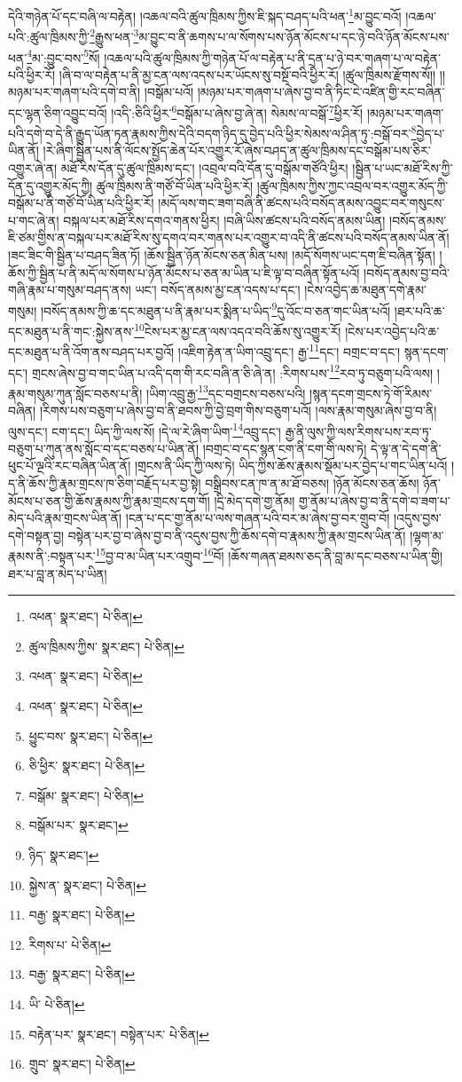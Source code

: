 དེའི་གཉེན་པོ་དང་བཞི་ལ་བརྟེན། །འཆལ་བའི་ཚུལ་ཁྲིམས་ཀྱིས་ཇི་སྐད་བཤད་པའི་ཕན་\footnote{འཕན་  སྣར་ཐང་།  པེ་ཅིན། }མ་བྱུང་བའོ། །འཆལ་པའི་:ཚུལ་ཁྲིམས་ཀྱི་\footnote{ཚུལ་ཁྲིམས་ཀྱིས་  སྣར་ཐང་།  པེ་ཅིན། }རྒྱུས་ཕན་\footnote{འཕན་  སྣར་ཐང་།  པེ་ཅིན། }མ་བྱུང་བ་ནི་ཆགས་པ་ལ་སོགས་པས་ཉོན་མོངས་པ་དང་ཉེ་བའི་ཉོན་མོངས་པས་ཕན་\footnote{འཕན་  སྣར་ཐང་།  པེ་ཅིན། }མ་:བྱུང་བས་\footnote{ཕྱུང་བས་  སྣར་ཐང་།  པེ་ཅིན། }སོ། །འཆལ་པའི་ཚུལ་ཁྲིམས་ཀྱི་གཉེན་པོ་ལ་བརྟེན་པ་ནི་དྲན་པ་ཉེ་བར་གཞག་པ་ལ་བརྟེན་པའི་ཕྱིར་རོ། །ཞི་བ་ལ་བརྟེན་པ་ནི་མྱ་ངན་ལས་འདས་པར་ཡོངས་སུ་བསྔོ་བའི་ཕྱིར་རོ། །ཚུལ་ཁྲིམས་རྫོགས་སོ།། །།མཉམ་པར་གཞག་པའི་དགེ་བ་ནི། །བསྒོམ་པའོ། །མཉམ་པར་གཞག་པ་ཞེས་བྱ་བ་ནི་ཏིང་ངེ་འཛིན་གྱི་རང་བཞིན་དང་ལྷན་ཅིག་འབྱུང་བའོ། །འདི་:ཅིའི་ཕྱིར་\footnote{ཅི་ཕྱིར་  སྣར་ཐང་།  པེ་ཅིན། }བསྒོམ་པ་ཞེས་བྱ་ཞེ་ན། སེམས་ལ་བསྒོ་\footnote{བསྒོམ་  སྣར་ཐང་།  པེ་ཅིན། }ཕྱིར་རོ། །མཉམ་པར་གཞག་པའི་དགེ་བ་དེ་ནི་རྒྱུད་ཡོན་ཏན་རྣམས་ཀྱིས་དེའི་བདག་ཉིད་དུ་བྱེད་པའི་ཕྱིར་སེམས་ལ་ཤིན་ཏུ་:བསྒོ་བར་\footnote{བསྒོམ་པར་  སྣར་ཐང་། }བྱེད་པ་ཡིན་ནོ། །རེ་ཞིག་སྦྱིན་པས་ནི་ལོངས་སྤྱོད་ཆེན་པོར་འགྱུར་རོ་ཞེས་བཤད་ན་ཚུལ་ཁྲིམས་དང་བསྒོམ་པས་ཅིར་འགྱུར་ཞེ་ན། མཐོ་རིས་དོན་དུ་ཚུལ་ཁྲིམས་དང་། །འབྲལ་བའི་དོན་དུ་བསྒོམ་གཙོའི་ཕྱིར། །སྦྱིན་པ་ཡང་མཐོ་རིས་ཀྱི་དོན་དུ་འགྱུར་མོད་ཀྱི། ཚུལ་ཁྲིམས་ནི་གཙོ་བོ་ཡིན་པའི་ཕྱིར་རོ། །ཚུལ་ཁྲིམས་ཀྱིས་ཀྱང་འབྲལ་བར་འགྱུར་མོད་ཀྱི་བསྒོམ་པ་ནི་གཙོ་བོ་ཡིན་པའི་ཕྱིར་རོ། །མདོ་ལས་གང་ཟག་བཞི་ནི་ཚངས་པའི་བསོད་ནམས་འབྱུང་བར་གསུངས་པ་གང་ཞེ་ན། བསྐལ་པར་མཐོ་རིས་དགའ་གནས་ཕྱིར། །བཞི་ཡིས་ཚངས་པའི་བསོད་ནམས་ཡིན། །བསོད་ནམས་ཇི་ཙམ་གྱིས་ན་བསྐལ་པར་མཐོ་རིས་སུ་དགའ་བར་གནས་པར་འགྱུར་བ་འདི་ནི་ཚངས་པའི་བསོད་ནམས་ཡིན་ནོ། །ཟང་ཟིང་གི་སྦྱིན་པ་བཤད་ཟིན་ཏོ། །ཆོས་སྦྱིན་ཉོན་མོངས་ཅན་མིན་པས། །མདོ་སོགས་ཡང་དག་ཇི་བཞིན་སྟོན། །ཆོས་ཀྱི་སྦྱིན་པ་ནི་མདོ་ལ་སོགས་པ་ཉོན་མོངས་པ་ཅན་མ་ཡིན་པ་ཇི་ལྟ་བ་བཞིན་སྟོན་པའོ། །བསོད་ནམས་བྱ་བའི་གཞི་རྣམ་པ་གསུམ་བཤད་ནས། ཡང་། བསོད་ནམས་མྱ་ངན་འདས་པ་དང་། །ངེས་འབྱེད་ཆ་མཐུན་དགེ་རྣམ་གསུམ། །བསོད་ནམས་ཀྱི་ཆ་དང་མཐུན་པ་ནི་རྣམ་པར་སྨིན་པ་ཡིད་\footnote{ཉིད་  སྣར་ཐང་། }དུ་འོང་བ་ཅན་གང་ཡིན་པའོ། །ཐར་པའི་ཆ་དང་མཐུན་པ་ནི་གང་:སྐྱེས་ནས་\footnote{སྐྱེས་ན་  སྣར་ཐང་།  པེ་ཅིན། }ངེས་པར་མྱ་ངན་ལས་འདའ་བའི་ཆོས་སུ་འགྱུར་རོ། །ངེས་པར་འབྱེད་པའི་ཆ་དང་མཐུན་པ་ནི་འོག་ནས་བཤད་པར་བྱའོ། །འཇིག་རྟེན་ན་ཡིག་འབྲུ་དང་། རྒྱ་\footnote{བརྒྱ་  སྣར་ཐང་།  པེ་ཅིན། }དང་། བགྲང་བ་དང་། སྙན་དངག་དང་། གྲངས་ཞེས་བྱ་བ་གང་ཡིན་པ་འདི་དག་གི་རང་བཞི་ན་ཅི་ཞེ་ན། :རིགས་པས་\footnote{རིགས་པ་  པེ་ཅིན། }རབ་ཏུ་བཅུག་པའི་ལས། །རྣམ་གསུམ་ཀུན་སློང་བཅས་པ་ནི། །ཡིག་འབྲུ་རྒྱ་\footnote{བརྒྱ་  སྣར་ཐང་།  པེ་ཅིན། }དང་བགྲངས་བཅས་པའི། །སྙན་དངག་གྲངས་ཏེ་གོ་རིམས་བཞིན། །རིགས་པས་བཅུག་པ་ཞེས་བྱ་བ་ནི་ཐབས་ཀྱི་བྱེ་བྲག་གིས་བཅུག་པའོ། །ལས་རྣམ་གསུམ་ཞེས་བྱ་བ་ནི། ལུས་དང་། ངག་དང་། ཡིད་ཀྱི་ལས་སོ། །དེ་ལ་རེ་ཞིག་ཡིག་\footnote{ཡི་  པེ་ཅིན། }འབྲུ་དང་། རྒྱ་ནི་ལུས་ཀྱི་ལས་རིགས་པས་རབ་ཏུ་བཅུག་པ་ཀུན་ནས་སློང་བ་དང་བཅས་པ་ཡིན་ནོ། །བགྲང་བ་དང་སྙན་ངག་ནི་ངག་གི་ལས་ཏེ། དེ་ལྟ་ན་དེ་དག་ནི་ཕུང་པོ་ལྔའི་རང་བཞིན་ཡིན་ནོ། །གྲངས་ནི་ཡིད་ཀྱི་ལས་ཏེ། ཡིད་ཀྱིས་ཆོས་རྣམས་སྡོམ་པར་བྱེད་པ་གང་ཡིན་པའོ། །ད་ནི་ཆོས་ཀྱི་རྣམ་གྲངས་ཁ་ཅིག་བརྗོད་པར་བྱ་སྟེ། བསྒྲིབས་ངན་ཁ་ན་མ་ཐོ་བཅས། །ཉོན་མོངས་ཅན་ཆོས། ཉོན་མོངས་པ་ཅན་གྱི་ཆོས་རྣམས་ཀྱི་རྣམ་གྲངས་དག་གོ། །དྲི་མེད་དགེ་གྱ་ནོམ། གྱ་ནོམ་པ་ཞེས་བྱ་བ་ནི་དགེ་བ་ཟག་པ་མེད་པའི་རྣམ་གྲངས་ཡིན་ནོ། །ངན་པ་དང་གྱ་ནོམ་པ་ལས་གཞན་པའི་བར་མ་ཞེས་བྱ་བར་གྲུབ་བོ། །འདུས་བྱས་དགེ་བསྟན་བྱ། བསྟེན་པར་བྱ་བ་ཞེས་བྱ་བ་ནི་འདུས་བྱས་ཀྱི་ཆོས་དགེ་བ་རྣམས་ཀྱི་རྣམ་གྲངས་ཡིན་ནོ། །ལྷག་མ་རྣམས་ནི་:བསྟན་པར་\footnote{བརྟེན་པར་  སྣར་ཐང་། བསྟེན་པར་  པེ་ཅིན། }བྱ་བ་མ་ཡིན་པར་འགྲུབ་\footnote{གྲུབ་  སྣར་ཐང་།  པེ་ཅིན། }བོ། །ཆོས་གཞན་ཐམས་ཅད་ནི་བླ་མ་དང་བཅས་པ་ཡིན་གྱི། ཐར་པ་བླ་ན་མེད་པ་ཡིན། 